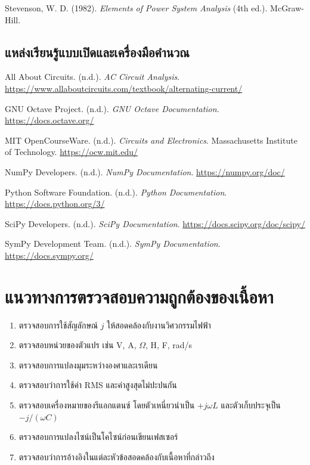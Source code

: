 Stevenson, W. D. (1982). \textit{Elements of Power System Analysis} (4th ed.). McGraw-Hill.

\subsection*{แหล่งเรียนรู้แบบเปิดและเครื่องมือคำนวณ}

All About Circuits. (n.d.). \textit{AC Circuit Analysis}. \url{https://www.allaboutcircuits.com/textbook/alternating-current/}

GNU Octave Project. (n.d.). \textit{GNU Octave Documentation}. \url{https://docs.octave.org/}

MIT OpenCourseWare. (n.d.). \textit{Circuits and Electronics}. Massachusetts Institute of Technology. \url{https://ocw.mit.edu/}

NumPy Developers. (n.d.). \textit{NumPy Documentation}. \url{https://numpy.org/doc/}

Python Software Foundation. (n.d.). \textit{Python Documentation}. \url{https://docs.python.org/3/}

SciPy Developers. (n.d.). \textit{SciPy Documentation}. \url{https://docs.scipy.org/doc/scipy/}

SymPy Development Team. (n.d.). \textit{SymPy Documentation}. \url{https://docs.sympy.org/}

\section{แนวทางการตรวจสอบความถูกต้องของเนื้อหา}

\begin{enumerate}
\item ตรวจสอบการใช้สัญลักษณ์ $j$ ให้สอดคล้องกับงานวิศวกรรมไฟฟ้า
\item ตรวจสอบหน่วยของตัวแปร เช่น V, A, $\Omega$, H, F, rad/s
\item ตรวจสอบการแปลงมุมระหว่างองศาและเรเดียน
\item ตรวจสอบว่าการใช้ค่า RMS และค่าสูงสุดไม่ปะปนกัน
\item ตรวจสอบเครื่องหมายของรีแอกแตนซ์ โดยตัวเหนี่ยวนำเป็น $+j\omega L$ และตัวเก็บประจุเป็น $-j/(\omega C)$
\item ตรวจสอบการแปลงไซน์เป็นโคไซน์ก่อนเขียนเฟสเซอร์
\item ตรวจสอบว่าการอ้างอิงในแต่ละหัวข้อสอดคล้องกับเนื้อหาที่กล่าวถึง
\end{enumerate}

\clearpage
